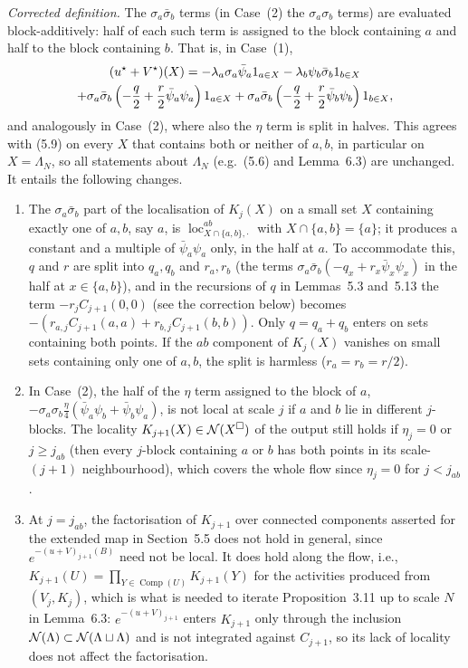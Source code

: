 \documentclass[11pt]{amsart}
\numberwithin{equation}{section}
\newcommand{\obs}{\star}
\newcommand{\Vobs}{V^\obs}
\newcommand{\uobs}{u^\obs}
\newcommand{\loc}{\operatorname{loc}}
\newcommand{\Comp}{\operatorname{Comp}}
\begin{document}
\emph{Corrected definition.} The $\sigma_a\bar\sigma_b$ terms (in Case~(2) the $\sigma_a\sigma_b$
terms) are evaluated block-additively: half of each such term is assigned to the block
containing $a$ and half to the block containing $b$. That is, in Case~(1),
\begin{multline*}
  (\uobs+\Vobs)(X) =
  -\lambda_a\sigma_a\bar\psi_a1_{a\in X}-\lambda_b\psi_b\bar\sigma_b1_{b\in X}
  \\
  +\sigma_a\bar\sigma_b\pa{-\frac q2+\frac r2\bar\psi_a\psi_a}1_{a\in X}
  +\sigma_a\bar\sigma_b\pa{-\frac q2+\frac r2\bar\psi_b\psi_b}1_{b\in X},
\end{multline*}
and analogously in Case~(2), where also the $\eta$ term is split in halves. This agrees with
(5.9) on every $X$ that contains both or neither of $a,b$, in particular on $X=\Lambda_N$, so
all statements about $\Lambda_N$ (e.g.\ (5.6) and Lemma~6.3) are unchanged. It entails the
following changes.
\begin{enumerate}
\item The $\sigma_a\bar\sigma_b$ part of the localisation of $K_j(X)$ on a small set $X$ containing
  exactly one of $a,b$, say $a$, is $\loc^{ab}_{X\cap\{a,b\},\cdot}$ with $X\cap\{a,b\}=\{a\}$; it
  produces a constant and a multiple of $\bar\psi_a\psi_a$ only, in the half at $a$. To accommodate
  this, $q$ and $r$ are split into $q_a,q_b$ and $r_a,r_b$ (the terms
  $\sigma_a\bar\sigma_b(-q_x+r_x\bar\psi_x\psi_x)$ in the half at $x\in\{a,b\}$), and in the
  recursions of $q$ in Lemmas~5.3 and~5.13 the term $-r_jC_{j+1}(0,0)$ (see the correction below)
  becomes $-(r_{a,j}C_{j+1}(a,a)+r_{b,j}C_{j+1}(b,b))$. Only $q=q_a+q_b$ enters on sets containing
  both points. If the $ab$ component of $K_j(X)$ vanishes on small sets containing only one
  of $a,b$, the split is harmless ($r_a=r_b=r/2$).
\item In Case~(2), the half of the $\eta$ term assigned to the block of $a$,
  $-\sigma_a\sigma_b\frac\eta4(\bar\psi_a\psi_b+\bar\psi_b\psi_a)$, is not local at scale $j$ if $a$
  and $b$ lie in different $j$-blocks. The locality $K_{j+1}(X)\in\mathcal N(X^\square)$ of the output
  still holds if $\eta_j=0$ or $j\ge j_{ab}$ (then every $j$-block containing $a$ or $b$ has both
  points in its scale-$(j+1)$ neighbourhood), which covers the whole flow since $\eta_j=0$ for
  $j<j_{ab}$.
\item At $j=j_{ab}$, the factorisation of $K_{j+1}$ over connected components asserted for the
  extended map in Section~5.5 does not hold in general, since $e^{-(u+V)_{j+1}(B)}$ need not be
  local. It does hold along the flow, i.e., $K_{j+1}(U)=\prod_{Y\in\Comp(U)}K_{j+1}(Y)$ for the
  activities produced from $(V_j,K_j)$, which is what is needed to iterate Proposition~3.11
  up to scale $N$ in Lemma~6.3: $e^{-(u+V)_{j+1}}$ enters $K_{j+1}$ only through the inclusion
  $\mathcal N(\Lambda)\subset\mathcal N(\Lambda\sqcup\Lambda)$ and is not integrated against $C_{j+1}$, so its
  lack of locality does not affect the factorisation.
\end{enumerate}
\end{document}
